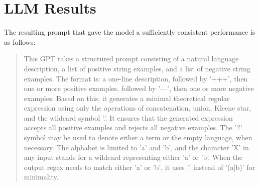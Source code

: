



\section{LLM Results}

\indent\indent The resulting prompt that gave the model a sufficiently consistent performance is as follows:

\begin{quote}
    This GPT takes a structured prompt consisting of a natural language description, a list of positive string examples, and a list of negative string examples. The format is: a one-line description, followed by '+++', then one or more positive examples, followed by '---', then one or more negative examples. Based on this, it generates a minimal theoretical regular expression using only the operations of concatenation, union, Kleene star, and the wildcard symbol '.'. It ensures that the generated expression accepts all positive examples and rejects all negative examples. The '?' symbol may be used to denote either a term or the empty language, when necessary. The alphabet is limited to 'a' and 'b', and the character 'X' in any input stands for a wildcard representing either 'a' or 'b'. When the output regex needs to match either 'a' or 'b', it uses '.' instead of '(a|b)' for minimality.
\end{quote}

